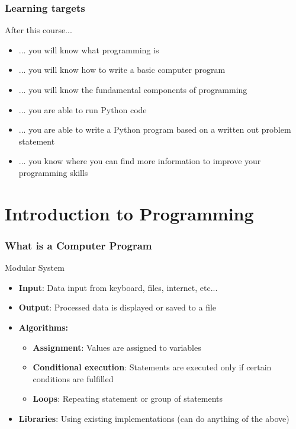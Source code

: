 \documentclass[10pt, a4paper]{beamer} %
\begin{document}
\begin{frame}[t]\frametitle{Learning targets}
    
After this course...
\begin{itemize}
    \item ... you will know what programming is
    \item ... you will know how to write a basic computer program
    \item ... you will know the fundamental components of programming
    \item ... you are able to run Python code
    \item ... you are able to write a Python program based on a written out
    problem statement
    \item ... you know where you can find more information to improve your
    programming skills
\end{itemize}
\end{frame}


\section{Introduction to Programming} %
\label{sec:introduction_to_programming}

\begin{frame}[c]\frametitle{What is a Computer Program}
\begin{block}{Modular System}
    \begin{itemize}
        \item \textbf{Input}: Data input from keyboard, files, internet, etc...
        \item \textbf{Output}: Processed data is displayed or saved to a file
        \item \textbf{Algorithms:}
        \begin{itemize}
            \item \textbf{Assignment}: Values are assigned to variables
            \item \textbf{Conditional execution}: Statements are executed only if certain
            conditions are fulfilled
            \item \textbf{Loops}: Repeating statement or group of statements
        \end{itemize}
        
        \item \textbf{Libraries}: Using existing implementations (can do anything of the above)
    \end{itemize}

\end{block}     
\end{frame}
\end{document}
